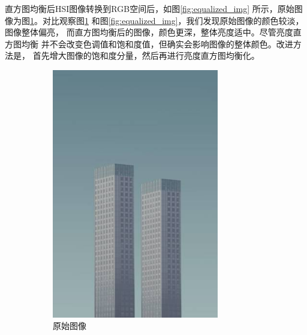 \documentclass[UTF8]{article}
\begin{document}
直方图均衡后HSI图像转换到RGB空间后，如图\ref{fig:equalized_img}
所示，原始图像为图\ref{fig:original}。对比观察图\ref{fig:original}
和图\ref{fig:equalized_img}，我们发现原始图像的颜色较淡，图像整体偏亮，
而直方图均衡后的图像，颜色更深，整体亮度适中。尽管亮度直方图均衡
并不会改变色调值和饱和度值，但确实会影响图像的整体颜色。改进方法是，
首先增大图像的饱和度分量，然后再进行亮度直方图均衡化。
\begin{figure}[htbp]
    \centering
    \begin{subfigure}{0.45\textwidth}
      \centering
      \includegraphics[width=0.8\textwidth]{img/original.jpg}
      \caption{原始图像}
      \label{fig:original} %
    \end{subfigure}
    \begin{subfigure}{0.45\textwidth}
      \centering

\end{subfigure}
\end{figure}
\end{document}
